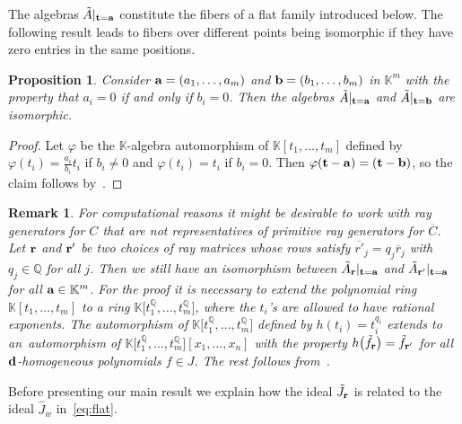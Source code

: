 \documentclass[pdftex]{sigma}%
\newtheorem{Proposition}[Theorem]{Proposition}
\newtheorem{Remark}[Theorem]{Remark}}
\numberwithin{equation}{section}
\begin{document}
The algebras $\tilde A\vert_{{\bf t}={\bf a}}$ constitute the fibers of a flat family introduced below.
The following result leads to fibers over different points being isomorphic if they have zero entries in the same positions.

\begin{Proposition}
Consider ${\bf a}=(a_1,\dots,a_m)$ and ${\bf b}=(b_1,\dots,b_m)$ in $\mathbb K^m$ with the property that $a_i=0$ if and only if $b_i=0$.
Then the algebras $\tilde A\vert_{{\bf t}={\bf a}}$ and $\tilde A\vert_{{\bf t}={\bf b}}$ are isomorphic.
\end{Proposition}
\begin{proof}
Let $\varphi$ be the $\mathbb K$-algebra automorphism of $\mathbb K[t_1,\dots,t_m]$ defined by $\varphi(t_i)=\frac{a_i}{b_i}t_i$ if $b_i\not =0$ and $\varphi(t_i)=t_i$ if $b_i=0$.
Then $\varphi({\bf t}-{\bf a})=({\bf t}-{\bf b})$, so the claim follows by~.
\end{proof}

\begin{Remark}
For computational reasons it might be desirable to work with ray generators for $C$ that are not representatives of primitive ray generators for $\overline{C}$.
Let ${\bf r}$ and ${\bf r'}$ be two choices of ray matrices whose rows satisfy $\overline{r'}_j=q_j\overline{r}_j$ with $q_j\in \mathbb Q$ for all $j$.
Then we still have an isomorphism between $\tilde A_{\bf r}\vert_{{\bf t}={\bf a}}$ and $\tilde A_{\bf r'}\vert_{{\bf t}={\bf a}}$ for all ${\bf a}\in \mathbb K^m$.
For the proof it is neces\-sary to extend the polynomial ring $\mathbb K[t_1,\dots,t_m]$ to a ring $\mathbb K\big[t_1^{\mathbb Q},\dots,t_m^{\mathbb Q}\big]$, where the $t_i$'s are allowed to have rational exponents.
The automorphism of $\mathbb K\big[t_1^{\mathbb Q},\dots,t_m^{\mathbb Q}\big]$ defined by $h(t_i)=t_i^{q_i}$ extends to an~auto\-morphism of $\mathbb K\big[t_1^{\mathbb Q},\dots,t_m^{\mathbb Q}\big][x_1,\dots,x_n]$ with the property $h\big(\tilde f_{\bf r}\big)=\tilde f_{\bf r'}$ for all ${\bf d}$-homogeneous polynomials $f\in J$.
The rest follows from~.
\end{Remark}

Before presenting our main result we explain how the ideal $\tilde J_{\bf r}$ is related to the ideal $\hat J_w$ in~\eqref{eq:flat}.
\end{document}
